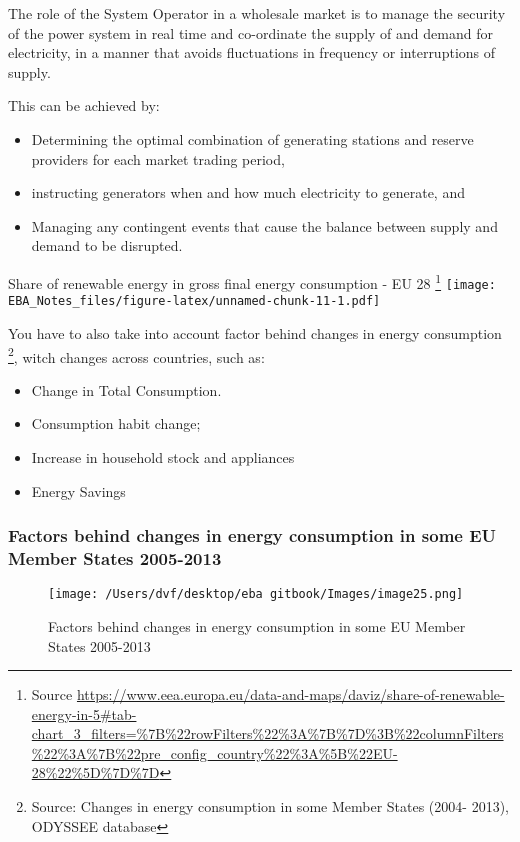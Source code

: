 \documentclass[]{book}
\providecommand{\tightlist}{%
  \setlength{\itemsep}{0pt}\setlength{\parskip}{0pt}}
\let\rmarkdownfootnote\footnote%
\def\footnote{\protect\rmarkdownfootnote}
\theoremstyle{definition}
\theoremstyle{definition}
\theoremstyle{definition}
\theoremstyle{remark}
\begin{document}
The role of the System Operator in a wholesale market is to manage the
security of the power system in real time and co-ordinate the supply of
and demand for electricity, in a manner that avoids fluctuations in
frequency or interruptions of supply.

This can be achieved by:

\begin{itemize}
\tightlist
\item
  Determining the optimal combination of generating stations and reserve
  providers for each market trading period,
\item
  instructing generators when and how much electricity to generate, and
\item
  Managing any contingent events that cause the balance between supply
  and demand to be disrupted.
\end{itemize}

Share of renewable energy in gross final energy consumption - EU 28
\footnote{Source
  \url{https://www.eea.europa.eu/data-and-maps/daviz/share-of-renewable-energy-in-5\#tab-chart_3_filters=\%7B\%22rowFilters\%22\%3A\%7B\%7D\%3B\%22columnFilters\%22\%3A\%7B\%22pre_config_country\%22\%3A\%5B\%22EU-28\%22\%5D\%7D\%7D}}
\texttt{[image: EBA\_Notes\_files/figure-latex/unnamed-chunk-11-1.pdf]}

You have to also take into account factor behind changes in energy
consumption \footnote{Source: Changes in energy consumption in some
  Member States (2004- 2013), ODYSSEE database}, witch changes across
countries, such as:

\begin{itemize}
\tightlist
\item
  Change in Total Consumption.
\item
  Consumption habit change;
\item
  Increase in household stock and appliances
\item
  Energy Savings
\end{itemize}

\subsubsection{Factors behind changes in energy consumption in some EU
Member States
2005-2013}\label{factors-behind-changes-in-energy-consumption-in-some-eu-member-states-2005-2013}

\begin{figure}[htbp]
\centering
\texttt{[image: /Users/dvf/desktop/eba gitbook/Images/image25.png]}
\caption{Factors behind changes in energy consumption in some EU Member
States 2005-2013}
\end{figure}
\end{document}
